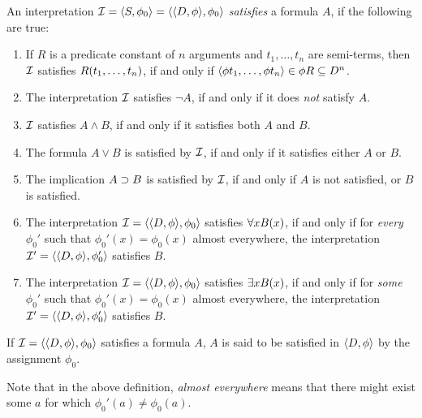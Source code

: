 \documentclass[11pt,a4paper]{article}
\begin{document}
\begin{definition}\label{def:formula satisfying interpretation}
    An interpretation \(\mathcal{I} = \langle S,\phi_0\rangle = \langle\langle D,\phi\rangle,\phi_0\rangle\)
    \emph{satisfies} a formula \(A\), if the following are true:
    \begin{enumerate}
        \item
            If \(R\) is a predicate constant of \(n\) arguments
            and \(t_1,\ldots,t_n\) are semi-terms, then \(\mathcal{I}\)
            satisfies \(R(t_1,\ldots,t_n)\), if and only if
            \(\langle\phi t_1,\ldots,\phi t_n\rangle\in\phi R \subseteq D^n\).
        \item
            The interpretation \(\mathcal{I}\) satisfies \(\lnot A\),
            if and only if it does \emph{not} satisfy \(A\).
        \item
            \(\mathcal{I}\) satisfies \(A\land B\), if and only if it satisfies
            both \(A\) and \(B\).
        \item
            The formula \(A\lor B\)
            is satisfied by \(\mathcal{I}\), if and only if it
            satisfies either \(A\) or \(B\).
        \item
            The implication \(A\supset B\) is satisfied by \(\mathcal{I}\),
            if and only if \(A\) is not satisfied,
            or \(B\) is satisfied.
        \item
            The interpretation \(\mathcal{I} = \langle\langle D,\phi\rangle,\phi_0\rangle\)
            satisfies \(\forall xB(x)\), if and only if for \emph{every} \(\phi_0'\)
            such that \(\phi_0'(x) = \phi_0(x)\) almost everywhere,
            the interpretation \(\mathcal{I}'=\langle\langle D,\phi\rangle,\phi_0'\rangle\) satisfies \(B\).
        \item
            The interpretation \(\mathcal{I} = \langle\langle D,\phi\rangle,\phi_0\rangle\)
            satisfies \(\exists xB(x)\), if and only if for \emph{some} \(\phi_0'\)
            such that \(\phi_0'(x) = \phi_0(x)\) almost everywhere,
            the interpretation \(\mathcal{I}'=\langle\langle D,\phi\rangle,\phi_0'\rangle\) satisfies \(B\).
    \end{enumerate}
    If \(\mathcal{I} = \langle\langle D,\phi\rangle,\phi_0\rangle\) satisfies a formula \(A\),
    \(A\) is said to be satisfied in \(\langle D,\phi\rangle\) by the assignment \(\phi_0\).
\end{definition}

Note that in the above definition, \emph{almost everywhere} means that there might
exist some \(a\) for which \(\phi_0'(a)\neq\phi_0(a)\).
\end{document}
